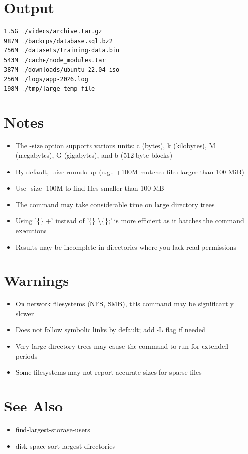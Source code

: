 \documentclass[openany]{book}
\begin{document}
\section*{Output}
\begin{lstlisting}
1.5G ./videos/archive.tar.gz
987M ./backups/database.sql.bz2
756M ./datasets/training-data.bin
543M ./cache/node_modules.tar
387M ./downloads/ubuntu-22.04-iso
256M ./logs/app-2026.log
198M ./tmp/large-temp-file
\end{lstlisting}

\section*{Notes}
\begin{itemize}
  \item The -size option supports various units: c (bytes), k (kilobytes), M (megabytes), G (gigabytes), and b (512-byte blocks)
  \item By default, -size rounds up (e.g., +100M matches files larger than 100 MiB)
  \item Use -size -100M to find files smaller than 100 MB
  \item The command may take considerable time on large directory trees
  \item Using '\{\}  +' instead of '\{\}  \textbackslash\{\};' is more efficient as it batches the command executions
  \item Results may be incomplete in directories where you lack read permissions
\end{itemize}

\section*{Warnings}
\begin{itemize}
  \item On network filesystems (NFS, SMB), this command may be significantly slower
  \item Does not follow symbolic links by default; add -L flag if needed
  \item Very large directory trees may cause the command to run for extended periods
  \item Some filesystems may not report accurate sizes for sparse files
\end{itemize}

\section*{See Also}
\begin{itemize}
  \item find-largest-storage-users
  \item disk-space-sort-largest-directories
\end{itemize}
\end{document}
